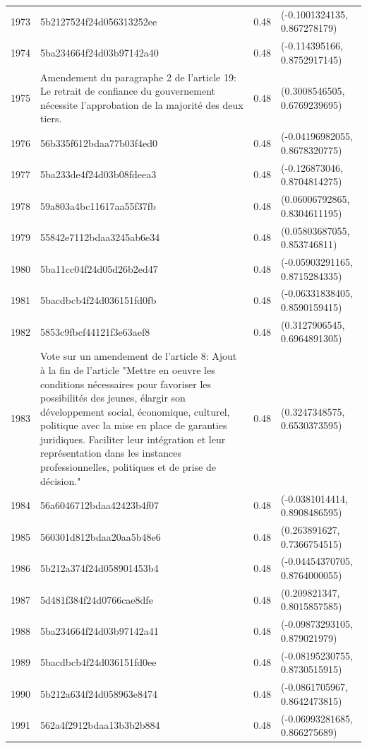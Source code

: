 \begin{table}[ht]
\begin{tabular}{rlrl}
  1973 & 5b2127524f24d056313252ee & 0.48 & (-0.1001324135, 0.867278179) \\ 
  1974 & 5ba234664f24d03b97142a40 & 0.48 & (-0.114395166, 0.8752917145) \\ 
  1975 & Amendement du paragraphe 2 de l'article 19: Le retrait de confiance du gouvernement nécessite l'approbation de la majorité des deux tiers. & 0.48 & (0.3008546505, 0.6769239695) \\ 
  1976 & 56b335f612bdaa77b03f4ed0 & 0.48 & (-0.04196982055, 0.8678320775) \\ 
  1977 & 5ba233de4f24d03b08fdeea3 & 0.48 & (-0.126873046, 0.8704814275) \\ 
  1978 & 59a803a4bc11617aa55f37fb & 0.48 & (0.06006792865, 0.8304611195) \\ 
  1979 & 55842e7112bdaa3245ab6e34 & 0.48 & (0.05803687055, 0.853746811) \\ 
  1980 & 5ba11cc04f24d05d26b2ed47 & 0.48 & (-0.05903291165, 0.8715284335) \\ 
  1981 & 5bacdbcb4f24d036151fd0fb & 0.48 & (-0.06331838405, 0.8590159415) \\ 
  1982 & 5853c9fbcf44121f3e63aef8 & 0.48 & (0.3127906545, 0.6964891305) \\ 
  1983 & Vote sur un amendement de l'article 8: Ajout à la fin de l’article "Mettre en oeuvre les conditions nécessaires pour favoriser les possibilités des jeunes, élargir son développement social, économique, culturel, politique avec la mise en place de garanties juridiques. Faciliter leur intégration et leur représentation dans les instances professionnelles, politiques et de prise de décision." & 0.48 & (0.3247348575, 0.6530373595) \\ 
  1984 & 56a6046712bdaa42423b4f07 & 0.48 & (-0.0381014414, 0.8908486595) \\ 
  1985 & 560301d812bdaa20aa5b48e6 & 0.48 & (0.263891627, 0.7366754515) \\ 
  1986 & 5b212a374f24d058901453b4 & 0.48 & (-0.04454370705, 0.8764000055) \\ 
  1987 & 5d481f384f24d0766cae8dfe & 0.48 & (0.209821347, 0.8015857585) \\ 
  1988 & 5ba234664f24d03b97142a41 & 0.48 & (-0.09873293105, 0.879021979) \\ 
  1989 & 5bacdbcb4f24d036151fd0ee & 0.48 & (-0.08195230755, 0.8730515915) \\ 
  1990 & 5b212a634f24d058963e8474 & 0.48 & (-0.0861705967, 0.8642473815) \\ 
  1991 & 562a4f2912bdaa13b3b2b884 & 0.48 & (-0.06993281685, 0.866275689) \\ 

\end{tabular}
\end{table}
